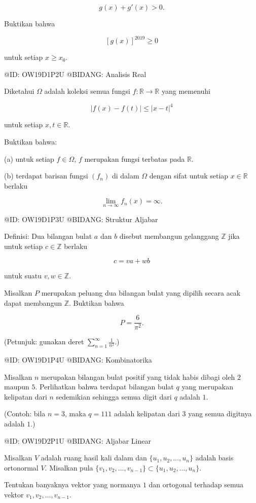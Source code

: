 $$
g(x)+g'(x)>0.
$$

Buktikan bahwa

$$
[g(x)]^{2019}\ge0
$$

untuk setiap $x\ge x_0$.

@ID: OW19D1P2U
@BIDANG: Analisis Real

Diketahui $\Omega$ adalah koleksi semua fungsi $f:\mathbb R\to\mathbb R$ yang memenuhi

$$
|f(x)-f(t)|\le |x-t|^4
$$

untuk setiap $x,t\in\mathbb R$.

Buktikan bahwa:

(a) untuk setiap $f\in\Omega$, $f$ merupakan fungsi terbatas pada $\mathbb R$.

(b) terdapat barisan fungsi $(f_n)$ di dalam $\Omega$ dengan sifat untuk setiap $x\in\mathbb R$ berlaku

$$
\lim_{n\to\infty}f_n(x)=\infty.
$$

@ID: OW19D1P3U
@BIDANG: Struktur Aljabar

Definisi: Dua bilangan bulat $a$ dan $b$ disebut membangun gelanggang $\mathbb Z$ jika untuk setiap $c\in\mathbb Z$ berlaku

$$
c=va+wb
$$

untuk suatu $v,w\in\mathbb Z$.

Misalkan $P$ merupakan peluang dua bilangan bulat yang dipilih secara acak dapat membangun $\mathbb Z$. Buktikan bahwa

$$
P=\frac6{\pi^2}.
$$

(Petunjuk: gunakan deret $\sum_{n=1}^{\infty}\frac1{n^2}$.)

@ID: OW19D1P4U
@BIDANG: Kombinatorika

Misalkan $n$ merupakan bilangan bulat positif yang tidak habis dibagi oleh $2$ maupun $5$. Perlihatkan bahwa terdapat bilangan bulat $q$ yang merupakan kelipatan dari $n$ sedemikian sehingga semua digit dari $q$ adalah $1$.

(Contoh: bila $n=3$, maka $q=111$ adalah kelipatan dari $3$ yang semua digitnya adalah $1$.)

@ID: OW19D2P1U
@BIDANG: Aljabar Linear

Misalkan $V$ adalah ruang hasil kali dalam dan $\{u_1,u_2,\ldots,u_n\}$ adalah basis ortonormal $V$. Misalkan pula $\{v_1,v_2,\ldots,v_{n-1}\}\subset\{u_1,u_2,\ldots,u_n\}$.

Tentukan banyaknya vektor yang normanya $1$ dan ortogonal terhadap semua vektor $v_1,v_2,\ldots,v_{n-1}$.

